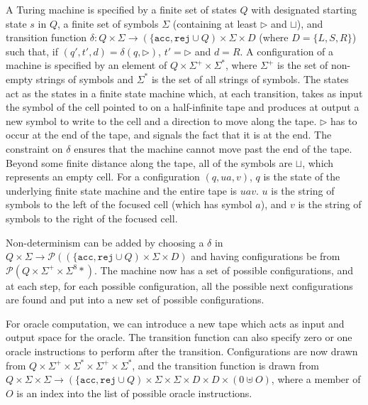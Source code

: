 \documentclass{article}
\begin{document}
\begin{enumerate}
    A Turing machine is specified by a finite set of states $Q$ with designated starting state $s$ in $Q$, a finite set of symbols $\Sigma$ (containing at least $\triangleright$ and $\sqcup$), and transition function $\delta : Q \times \Sigma \to (\{\mathtt{acc}, \mathtt{rej} \cup Q) \times \Sigma \times D$ (where $D = \{L, S, R\}$) such that, if $(q', t', d) = \delta(q, \triangleright)$, $t' = \triangleright$ and $d = R$. A configuration of a machine is specified by an element of $Q \times \Sigma^+ \times \Sigma^*$, where $\Sigma^+$ is the set of non-empty strings of symbols and $\Sigma^*$ is the set of all strings of symbols. The states act as the states in a finite state machine which, at each transition, takes as input the symbol of the cell pointed to on a half-infinite tape and produces at output a new symbol to write to the cell and a direction to move along the tape. $\triangleright$ has to occur at the end of the tape, and signals the fact that it is at the end. The constraint on $\delta$ ensures that the machine cannot move past the end of the tape. Beyond some finite distance along the tape, all of the symbols are $\sqcup$, which represents an empty cell. For a configuration $(q, ua, v)$, $q$ is the state of the underlying finite state machine and the entire tape is $uav$. $u$ is the string of symbols to the left of the focused cell (which has symbol $a$), and $v$ is the string of symbols to the right of the focused cell.

    Non-determinism can be added by choosing a $\delta$ in $Q \times \Sigma \to \mathcal P((\{\mathtt{acc}, \mathtt{rej} \cup Q) \times \Sigma \times D)$ and having configurations be from $\mathcal P(Q \times \Sigma^+ \times \Sigma^8*)$. The machine now has a set of possible configurations, and at each step, for each possible configuration, all the possible next configurations are found and put into a new set of possible configurations.

    For oracle computation, we can introduce a new tape which acts as input and output space for the oracle. The transition function can also specify zero or one oracle instructions to perform after the transition. Configurations are now drawn from $Q \times \Sigma^+ \times \Sigma^* \times \Sigma^+ \times \Sigma^*$, and the transition function is drawn from $Q \times \Sigma \times \Sigma \to (\{\mathtt{acc}, \mathtt{rej} \cup Q) \times \Sigma \times \Sigma \times D \times D \times (0 \uplus O)$, where a member of $O$ is an index into the list of possible oracle instructions.


\end{enumerate}
\end{document}
